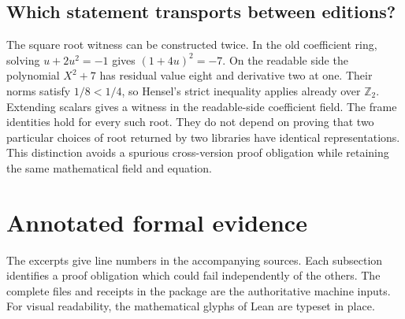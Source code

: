 \documentclass[12pt,letterpaper]{article}
\begin{document}
\subsection{Which statement transports between editions?}
The square root witness can be constructed twice. In the old coefficient ring, solving $u+2u^2=-1$ gives $(1+4u)^2=-7$. On the readable side the polynomial $X^2+7$ has residual value eight and derivative two at one. Their norms satisfy $1/8<1/4$, so Hensel's strict inequality applies already over $\mathbb Z_2$. Extending scalars gives a witness in the readable-side coefficient field. The frame identities hold for every such root. They do not depend on proving that two particular choices of root returned by two libraries have identical representations. This distinction avoids a spurious cross-version proof obligation while retaining the same mathematical field and equation.

\section{Annotated formal evidence}
The excerpts give line numbers in the accompanying sources. Each subsection identifies a proof obligation which could fail independently of the others. The complete files and receipts in the package are the authoritative machine inputs. For visual readability, the mathematical glyphs of Lean are typeset in place.
\end{document}
